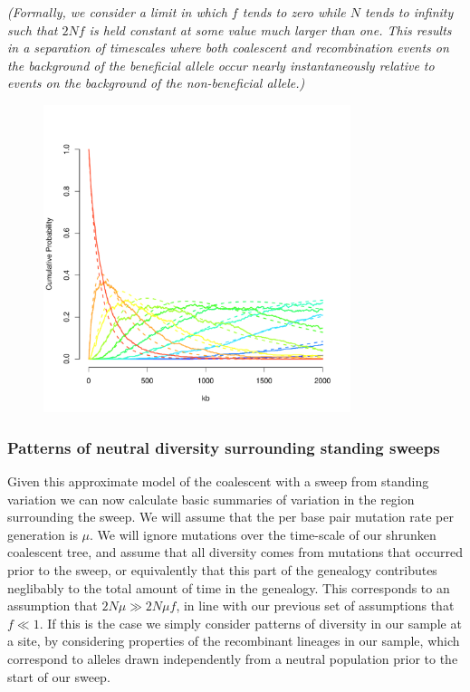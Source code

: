 \documentclass[a4paper,10pt]{article}
\newcommand{\jb}[1]{{\it\color{blue} (#1)} }
\begin{document}
\jb{Formally, we consider a limit in which $f$ tends to zero while $N$ tends to infinity such that $2Nf$ is held constant at some value much larger than one. This results in a separation of timescales where both coalescent and recombination events on the background of the beneficial allele occur nearly instantaneously relative to events on the background of the non-beneficial allele.}

\begin{figure}
	\includegraphics[width = 0.8\textwidth]{../Paper_Figures/Ewens_vs_Jeremy.pdf}
\end{figure}


\subsubsection{Patterns of neutral diversity surrounding standing sweeps}
Given this approximate model of the coalescent with a sweep from standing variation we can now calculate basic summaries of variation in the region surrounding the sweep. We will assume that the per base pair mutation rate per generation is $\mu$. We will ignore mutations over the time-scale of our shrunken coalescent tree, and assume that all diversity comes from mutations that occurred prior to the sweep, or equivalently that this part of the genealogy contributes neglibably to the total amount of time in the genealogy. This corresponds to an assumption that $2N\mu \gg 2N \mu f$, in line with our previous set of assumptions that $f \ll 1$. If this is the case we simply consider patterns of diversity in our sample at a site, by considering properties of the recombinant lineages in our sample, which correspond to alleles drawn independently from a neutral population prior to the start of our sweep.
\end{document}
